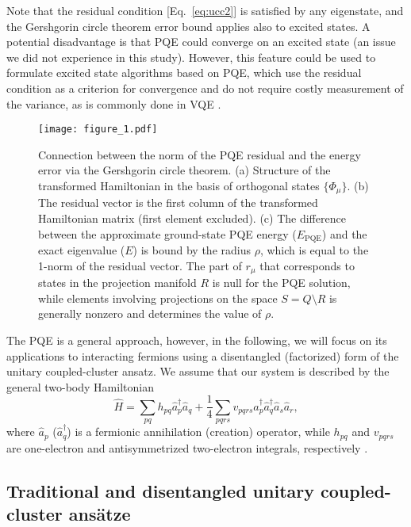 \documentclass[aps,prx, reprint]{revtex4-2}
\newcommand{\cop}[1]{\hat{a}^{\dagger}_{#1}}
\newcommand{\aop}[1]{\hat{a}_{#1}}
\begin{document}
Note that the residual condition [Eq.~\eqref{eq:ucc2}] is satisfied by any eigenstate, and the Gershgorin circle theorem error bound applies also to excited states.
A potential disadvantage is that PQE could converge on an excited state (an issue we did not experience in this study).
However, this feature could be used to formulate excited state algorithms based on PQE, which use the residual condition as a criterion for convergence and do not require costly measurement of the variance, as is commonly done in VQE \cite{McClean:2016bs}.

\begin{figure}[ht!]
\centering
\texttt{[image: figure\_1.pdf]}
\caption{Connection between the norm of the PQE residual and the energy error via the Gershgorin circle theorem. (a) Structure of the transformed Hamiltonian in the basis of orthogonal states $\{\Phi_\mu\}$. (b) The residual vector is the first column of the transformed Hamiltonian matrix (first element excluded).
(c) The difference between the approximate ground-state PQE energy ($E_{\mathrm{PQE}}$) and the exact eigenvalue ($E$) is bound by the radius $\rho$, which is equal to the 1-norm of the residual vector.
The part of $r_\mu$ that corresponds to states in the projection manifold $R$ is null for the PQE solution, while elements involving projections on the space $S = Q \setminus R$ is generally nonzero and determines the value of $\rho$.}
\label{fig:residual}
\end{figure}

The PQE is a general approach, however, in the following, we will focus on its applications to interacting fermions using a disentangled (factorized) form of the unitary coupled-cluster ansatz.
We assume that our system is described by the general two-body Hamiltonian
\begin{equation}
\hat{H} = \sum_{pq} h_{pq} \cop{p} \aop{q}
+ \frac{1}{4} \sum_{pqrs}
v_{pqrs} \cop{p} \cop{q} \aop{s} \aop{r},
\end{equation}
where $\aop{p}$ ($\cop{q}$) is a fermionic annihilation (creation) operator, while $h_{pq}$ and $v_{pqrs}$
are one-electron and antisymmetrized two-electron integrals, respectively \cite{crawford2000introduction}.

\subsection{Traditional and disentangled unitary coupled-cluster ans\"{a}tze}
\label{sec:trad_dis_ucc}
\end{document}
